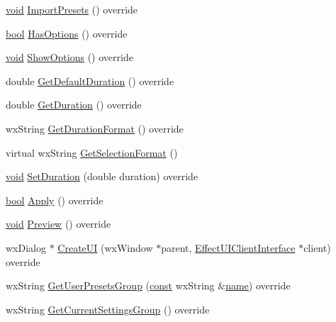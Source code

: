 \begin{DoxyCompactItemize}
\item 
\hyperlink{sound_8c_ae35f5844602719cf66324f4de2a658b3}{void} \hyperlink{class_effect_a60d7e2728c4b0c2a10e339edc4898c02}{Import\+Presets} () override
\item 
\hyperlink{mac_2config_2i386_2lib-src_2libsoxr_2soxr-config_8h_abb452686968e48b67397da5f97445f5b}{bool} \hyperlink{class_effect_ab2824bae4658c43129628a3e3e177d57}{Has\+Options} () override
\item 
\hyperlink{sound_8c_ae35f5844602719cf66324f4de2a658b3}{void} \hyperlink{class_effect_a106c4d140153495aa5a26d002a56e24f}{Show\+Options} () override
\item 
double \hyperlink{class_effect_ad3050b032c2e22dbe079983ffb2c232c}{Get\+Default\+Duration} () override
\item 
double \hyperlink{class_effect_ad0e9071bc9172d5ddf6cdc9352799c97}{Get\+Duration} () override
\item 
wx\+String \hyperlink{class_effect_a145dad8898032fa1a16d2327994b9c4c}{Get\+Duration\+Format} () override
\item 
virtual wx\+String \hyperlink{class_effect_afca4b01708200dbd0a141298db3a6e39}{Get\+Selection\+Format} ()
\item 
\hyperlink{sound_8c_ae35f5844602719cf66324f4de2a658b3}{void} \hyperlink{class_effect_a4b34edd03882489bc5d7d61d3e82f3f1}{Set\+Duration} (double duration) override
\item 
\hyperlink{mac_2config_2i386_2lib-src_2libsoxr_2soxr-config_8h_abb452686968e48b67397da5f97445f5b}{bool} \hyperlink{class_effect_ab518e147a42a49b2bf6a8c1b73890c1f}{Apply} () override
\item 
\hyperlink{sound_8c_ae35f5844602719cf66324f4de2a658b3}{void} \hyperlink{class_effect_a59055eef001cdb957751f5951d49b277}{Preview} () override
\item 
wx\+Dialog $\ast$ \hyperlink{class_effect_a672c4e2fedf11a2c21366490432ee5d1}{Create\+UI} (wx\+Window $\ast$parent, \hyperlink{class_effect_u_i_client_interface}{Effect\+U\+I\+Client\+Interface} $\ast$client) override
\item 
wx\+String \hyperlink{class_effect_a707754ebcd82f58510a8e9a0e10f97d2}{Get\+User\+Presets\+Group} (\hyperlink{getopt1_8c_a2c212835823e3c54a8ab6d95c652660e}{const} wx\+String \&\hyperlink{lib_2expat_8h_a1b49b495b59f9e73205b69ad1a2965b0}{name}) override
\item 
wx\+String \hyperlink{class_effect_a058541101e2a9496372810d0ef4d7fe4}{Get\+Current\+Settings\+Group} () override
\item 

\end{DoxyCompactItemize}
